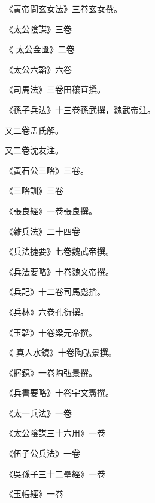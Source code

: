 \begin{pinyinscope}
 《黃帝問玄女法》三卷玄女撰。



 《太公陰謀》三卷



 《
 太公金匱》二卷



 《太公六韜》六卷



 《司馬法》三卷田穰苴撰。



 《孫子兵法》十三卷孫武撰，魏武帝注。



 又二卷孟氏解。



 又二卷沈友注。



 《黃石公三略》三卷。



 《三略訓》三卷



 《張良經》一卷張良撰。



 《雜兵法》二十四卷



 《兵法捷要》七卷魏武帝撰。



 《兵法要略》十卷魏文帝撰。



 《兵記》十二卷司馬彪撰。



 《兵林》六卷孔衍撰。



 《玉韜》十卷梁元帝撰。



 《
 真人水鏡》十卷陶弘景撰。



 《握鏡》一卷陶弘景撰。



 《兵書要略》十卷宇文憲撰。



 《太一兵法》一卷



 《太公陰謀三十六用》一卷



 《伍子公兵法》一卷



 《吳孫子三十二壘經》一卷



 《玉帳經》一卷




\end{pinyinscope}

